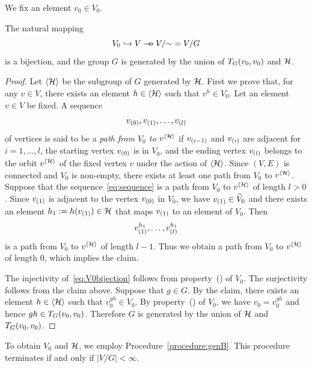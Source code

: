 \documentclass{amsart}
\numberwithin{procedure}{section}
\begin{document}
We fix an element $v_0\in V_0$.
%
\begin{proposition}
The natural mapping
\begin{equation}\label{eq:V0bijection}
V_0\hookrightarrow V\mathbin{\to \hskip -7pt \to} V/\mathord{\sim}=V/G
\end{equation}
is a bijection,
and the group $G$ is generated by the union of $T_G (v_0, v_0)$ and  $\mathord{\mathcal H}$.
\end{proposition}
%
\begin{proof}
Let $\langle {\mathord{\mathcal H}} \rangle$ be the subgroup of $G$ generated by $\mathord{\mathcal H}$.
First we prove that,
for any $v\in V$, there exists an element $h\in \langle {\mathord{\mathcal H}} \rangle$ such that
$v^h\in V_0$.
Let an element $v\in V$ be fixed.
A sequence
%
\begin{equation}\label{eq:sequence}
v\sb{(0)}, v\sb{(1)}, \dots, v\sb{(l)}
\end{equation}
%
of vertices is said to be a \emph{path from $V_0$ to $v^{\langle {\mathord{\mathcal H}} \rangle}$}
if $v\sb{(i-1)}$ and $v\sb{(i)}$ are adjacent for $i=1, \dots, l$,
the starting vertex $v\sb{(0)}$ is in $V_0$,
and the ending vertex $v\sb{(l)}$ belongs to the orbit $v^{\langle {\mathord{\mathcal H}} \rangle}$ of
the fixed vertex $v$
under the action of $\langle {\mathord{\mathcal H}} \rangle$.
Since $(V, E)$ is connected and $V_0$ is non-empty,
there exists at least one path from $V_0$ to $v^{\langle {\mathord{\mathcal H}} \rangle}$.
Suppose that the sequence~\eqref{eq:sequence} is
a path from $V_0$ to $v^{\langle {\mathord{\mathcal H}} \rangle}$  of length $l>0$.
Since $v\sb{(1)}$ is adjacent to the vertex $v\sb{(0)}$ in $V_0$,
we have $v\sb{(1)}\in \widetilde{V}_0$ and
there exists an element $h_1:=h(v\sb{(1)})\in \mathord{\mathcal H}$ that maps $v\sb{(1)}$ to
an element of $V_0$.
Then
\[
v\sb{(1)} \sp{h_1}, \dots, v\sb{(l)} \sp{h_1}
\]
is a path from $V_0$ to $v^{\langle {\mathord{\mathcal H}} \rangle}$  of length $l-1$.
Thus we obtain a path from $V_0$ to $v^{\langle {\mathord{\mathcal H}} \rangle}$  of length $0$,
which implies the claim.
\par
The injectivity of~\eqref{eq:V0bijection}
follows from property~() of $V_0$.
The surjectivity
follows from the claim above.
Suppose that $g\in G$.
By the claim,
there exists an element $h\in \langle {\mathord{\mathcal H}} \rangle$ such that $v_0^{gh}\in V_0$.
By property~() of $V_0$,
we have $v_0=v_0^{gh}$ and hence $gh\in T_G (v_0,v_0)$.
Therefore $G$ is generated by the union of $\mathord{\mathcal H}$ and $T_G (v_0, v_0)$.
\end{proof}
%
To obtain  $V_0$ and $\mathord{\mathcal H}$,
we employ Procedure~\ref{procedure:genB}.
This procedure terminates
if and only if $|V/G|<\infty$.
%
%
\end{document}
